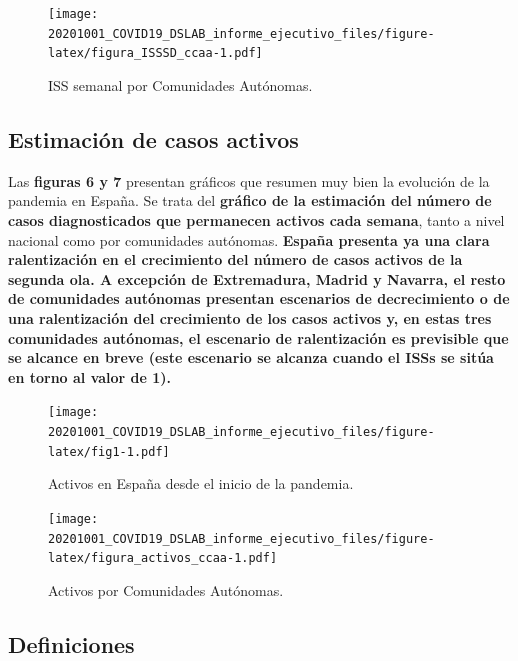 \documentclass[
  11pt,
]{article}
\begin{document}
\begin{figure}
\centering
\texttt{[image: 20201001\_COVID19\_DSLAB\_informe\_ejecutivo\_files/figure-latex/figura\_ISSSD\_ccaa-1.pdf]}
\caption{\label{fig:figura_ISSSD_ccaa} ISS semanal por Comunidades
Autónomas.}
\end{figure}

\vspace{0.2cm}

\clearpage

\hypertarget{estimaciuxf3n-de-casos-activos}{%
\subsection{Estimación de casos
activos}\label{estimaciuxf3n-de-casos-activos}}

Las \textbf{figuras 6 y 7} presentan gráficos que resumen muy bien la
evolución de la pandemia en España. Se trata del \textbf{gráfico de la
estimación del número de casos diagnosticados que permanecen activos
cada semana}, tanto a nivel nacional como por comunidades autónomas.
\textbf{España presenta ya una clara ralentización en el crecimiento del
número de casos activos de la segunda ola. A excepción de Extremadura,
Madrid y Navarra, el resto de comunidades autónomas presentan escenarios
de decrecimiento o de una ralentización del crecimiento de los casos
activos y, en estas tres comunidades autónomas, el escenario de
ralentización es previsible que se alcance en breve (este escenario se
alcanza cuando el ISSs se sitúa en torno al valor de 1). }

\vspace{0.2cm}

\begin{figure}
\centering
\texttt{[image: 20201001\_COVID19\_DSLAB\_informe\_ejecutivo\_files/figure-latex/fig1-1.pdf]}
\caption{\label{fig:fig17a_res} Activos en España desde el inicio de la
pandemia.}
\end{figure}

\begin{figure}
\centering
\texttt{[image: 20201001\_COVID19\_DSLAB\_informe\_ejecutivo\_files/figure-latex/figura\_activos\_ccaa-1.pdf]}
\caption{\label{fig:figura_activos_ccaa} Activos por Comunidades
Autónomas.}
\end{figure}

\clearpage

\hypertarget{definiciones}{%
\subsection{Definiciones}\label{definiciones}}
\end{document}
